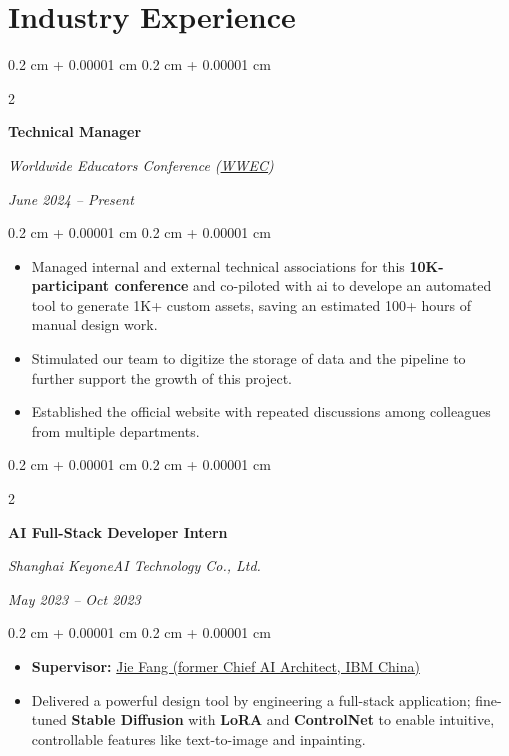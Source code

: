 \documentclass[10pt, letterpaper]{article}
\newenvironment{highlights}{
    \begin{itemize}[
        topsep=0.05 cm,
        parsep=0.05 cm,
        partopsep=0pt,
        itemsep=0pt,
        leftmargin=0.4 cm + 10pt
    ]
}{
    \end{itemize}
} %
\newenvironment{onecolentry}{
    \begin{adjustwidth}{
        0.2 cm + 0.00001 cm
    }{
        0.2 cm + 0.00001 cm
    }
}{
    \end{adjustwidth}
} %
\newenvironment{twocolentry}[2][]{
    \onecolentry
    \def\secondColumn{#2}
    \setcolumnwidth{\fill, 4.5 cm}
    \begin{paracol}{2}
}{
    \switchcolumn \raggedleft \secondColumn
    \end{paracol}
    \endonecolentry
} %
\begin{document}
\section{Industry Experience}
    \begin{twocolentry}{
        \textit{June 2024 – Present}
    }
        \textbf{Technical Manager}
        
        \textit{Worldwide Educators Conference (\href{https://www.wwec820.com/}{WWEC})}
        
    \end{twocolentry}
    \begin{onecolentry}
        \begin{highlights}
            \item Managed internal and external technical associations for this \textbf{10K-participant conference} and co-piloted with ai to develope an automated tool to generate 1K+ custom assets, saving an estimated 100+ hours of manual design work.
            \item Stimulated our team to digitize the storage of data and the pipeline to further support the growth of this project.
            \item Established the official website with repeated discussions among colleagues from multiple departments. \href{https://www.wwec820.com}{\faLink}
        \end{highlights}
    \end{onecolentry}

    \vspace{0.1cm}

    \begin{twocolentry}{
        \textit{May 2023 – Oct 2023}
    }
        \textbf{AI Full-Stack Developer Intern}
        
        \textit{Shanghai KeyoneAI Technology Co., Ltd.}
    \end{twocolentry}
    \begin{onecolentry}
        \begin{highlights}
            \item \textbf{Supervisor:} \href{https://www.linkedin.com/in/jie-fang-28293740}{Jie Fang (former Chief AI Architect, IBM China)}
            \item Delivered a powerful design tool by engineering a full-stack application; fine-tuned \textbf{Stable Diffusion} with \textbf{LoRA} and \textbf{ControlNet} to enable intuitive, controllable features like text-to-image and inpainting.
               \end{highlights}
    \end{onecolentry}
\end{document}

